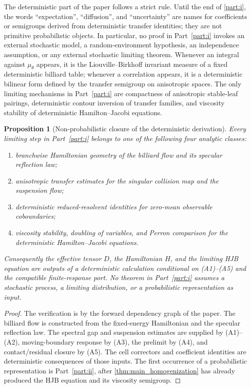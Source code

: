 \documentclass[12pt, letterpaper]{amsart}
\theoremstyle{plain}
\newtheorem{proposition}[theorem]{Proposition}
\theoremstyle{definition}
\theoremstyle{remark}
\begin{document}
The deterministic part of the paper follows a strict rule.  Until the end of
\cref{part:i}, the words ``expectation'', ``diffusion'', and ``uncertainty'' are
names for coefficients or semigroups derived from deterministic transfer
identities; they are not primitive probabilistic objects.  In particular, no
proof in Part~\ref{part:i} invokes an external stochastic model, a
random-environment hypothesis, an independence assumption, or any external
stochastic limiting theorem.  Whenever an integral against $\mu_\theta$
appears, it is the Liouville--Birkhoff invariant measure of a fixed
deterministic billiard table; whenever a correlation appears, it is a
deterministic bilinear form defined by the transfer semigroup on anisotropic
spaces.  The only limiting mechanisms in Part~\ref{part:i} are compactness of
anisotropic stable-leaf pairings, deterministic contour inversion of transfer
families, and viscosity stability of deterministic Hamilton--Jacobi equations.

\begin{proposition}[Non-probabilistic closure of the deterministic derivation]
\label{prop:partI_nonprobabilistic_closure}
Every limiting step in Part~\ref{part:i} belongs to one of the following four
analytic classes:
\begin{enumerate}[label=\textup{(\alph*)}, wide, labelindent=0pt]
    \item branchwise Hamiltonian geometry of the billiard flow and its specular
    reflection law;
    \item anisotropic transfer estimates for the singular collision map and the
    suspension flow;
    \item deterministic reduced-resolvent identities for zero-mean observable
    coboundaries;
    \item viscosity stability, doubling of variables, and Perron comparison for
    the deterministic Hamilton--Jacobi equations.
\end{enumerate}
Consequently the effective tensor $D$, the Hamiltonian $H$, and the limiting HJB
equation are outputs of a deterministic calculation \emph{conditional on}
\textup{(A1)--(A5)} and the compatible finite-response port.  No theorem in Part~\ref{part:i} assumes a stochastic
process, a limiting distribution, or a probabilistic representation as input.
\end{proposition}

\begin{proof}
The verification is by the forward dependency graph of the paper.  The billiard
flow is constructed from the fixed-energy Hamiltonian and the specular
reflection law.  The spectral gap and suspension estimates are supplied by
\textup{(A1)--(A2)}, moving-boundary response by \textup{(A3)}, the prelimit by
\textup{(A4)}, and contact/residual closure by \textup{(A5)}.  The cell
correctors and coefficient identities are deterministic consequences of those
inputs.  The first occurrence of a probabilistic representation is
Part~\ref{part:ii}, after \cref{thm:main_homogenization} has already produced
the HJB equation and its viscosity semigroup.
\end{proof}
\end{document}
